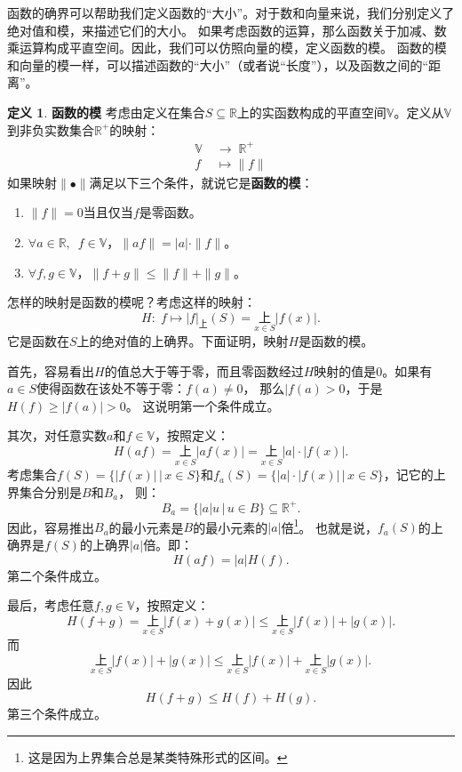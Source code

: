 \documentclass[12pt,UTF8]{ctexbook}
\theoremstyle{definition}
\newtheorem{df}{定义}[section]
\theoremstyle{plain}
\begin{document}
\begin{appendix}
函数的确界可以帮助我们定义函数的“大小”。对于数和向量来说，我们分别定义了绝对值和模，来描述它们的大小。
如果考虑函数的运算，那么函数关于加减、数乘运算构成平直空间。因此，我们可以仿照向量的模，定义函数的模。
函数的模和向量的模一样，可以描述函数的“大小”（或者说“长度”），以及函数之间的“距离”。
\begin{df}{\textbf{函数的模}}
    考虑由定义在集合$S\subseteq\mathbb{R}$上的实函数构成的平直空间$\mathbb{V}$。定义从$\mathbb{V}$到非负实数集合$\mathbb{R}^+$的映射：
    \begin{align*}
        \mathbb{V} \; &\rightarrow  \; \mathbb{R}^+ \\
        f &\mapsto \|f\|
    \end{align*}
    如果映射$\|\bullet \|$满足以下三个条件，就说它是\textbf{函数的模}：
    \begin{enumerate}
        \item $\|f\| = 0$当且仅当$f$是零函数。
        \item $\forall a\in\mathbb{R},\,\,\,f \in \mathbb{V}$，$\|af\| = |a| \cdot \|f\|$。
        \item $\forall f,g \in \mathbb{V}$，$\|f + g\| \leqslant \|f\| + \|g\|$。
    \end{enumerate}
\end{df}

怎样的映射是函数的模呢？考虑这样的映射：
$$ H:\; f \mapsto |f|_{\text{上}}(S) = \underset{x\in S}{\text{上}} |f(x)|. $$
它是函数在$S$上的绝对值的上确界。下面证明，映射$H$是函数的模。

首先，容易看出$H$的值总大于等于零，而且零函数经过$H$映射的值是$0$。如果有$a\in S$使得函数在该处不等于零：$f(a)\neq 0$，
那么$|f(a)>0$，于是$H(f) \geqslant |f(a)| > 0$。
这说明第一个条件成立。

其次，对任意实数$a$和$f\in\mathbb{V}$，按照定义：
$$ H(af) = \underset{x\in S}{\text{上}} |af(x)| = \underset{x\in S}{\text{上}} |a|\cdot |f(x)|. $$
考虑集合$f(S) = \{ |f(x)| \, | \, x\in S\}$和$f_a(S) = \{|a|\cdot |f(x)| \, | \, x\in S\}$，记它的上界集合分别是$B$和$B_a$，
则：
$$ B_a = \{|a| u \, | \, u \in B\} \subseteq \mathbb{R}^+. $$
因此，容易推出$B_a$的最小元素是$B$的最小元素的$|a|$倍\footnote{这是因为上界集合总是某类特殊形式的区间。}。
也就是说，$f_a(S)$的上确界是$f(S)$的上确界$|a|$倍。即：
$$ H(af) = |a| H(f). $$
第二个条件成立。

最后，考虑任意$f,g \in \mathbb{V}$，按照定义：
$$ H(f + g) = \underset{x\in S}{\text{上}} |f(x) + g(x)| \leqslant \underset{x\in S}{\text{上}} |f(x)| + |g(x)|. $$
而
$$ \underset{x\in S}{\text{上}} |f(x)| + |g(x)| \leqslant \underset{x\in S}{\text{上}} |f(x)| + \underset{x\in S}{\text{上}}|g(x)|.$$
因此
$$ H(f + g) \leqslant H(f) + H(g).$$
第三个条件成立。


\end{appendix}
\end{document}
